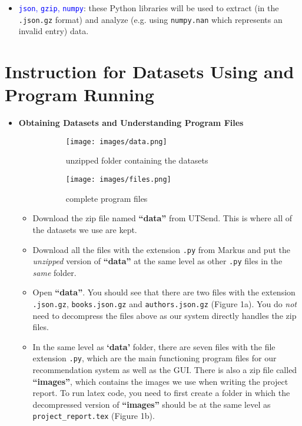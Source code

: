 \documentclass[fontsize=11pt]{article}
\begin{document}
\begin{itemize}
\begin{itemize}
    \item \textcolor{blue}{\texttt{json}, \texttt{gzip}, \texttt{numpy}}: these Python libraries will be used to extract (in the \texttt{.json.gz} format) and analyze (e.g. using \texttt{numpy.nan} which represents an invalid entry) data.
\end{itemize}
\end{itemize}

\section*{Instruction for Datasets Using and Program Running}
\begin{itemize}
    \item \textbf{Obtaining Datasets and Understanding Program Files}
    \begin{figure}[h!]
	\centering
        \begin{subfigure}[b]{0.3\textwidth}
    	\texttt{[image: images/data.png]}
            \caption{unzipped folder containing the datasets}
        \end{subfigure}
        \begin{subfigure}[b]{0.3\textwidth}
            \texttt{[image: images/files.png]}
            \caption{complete program files}
        \end{subfigure}
        \caption{}
        \label{fig:folder}
    \end{figure}
    \begin{itemize}
        \item Download the zip file named \textbf{``data''} from UTSend. This is where all of the datasets we use are kept.
        \item Download all the files with the extension \texttt{.py} from Markus and put the \textit{unzipped} version of \textbf{``data''} at the same level as other \texttt{.py} files in the \textit{same} folder.
        \item Open \textbf{``data''}. You should see that there are two files with the extension \texttt{.json.gz}, \texttt{books.json.gz} and \texttt{authors.json.gz} (Figure 1a). You do \textit{not} need to decompress the files above as our system directly handles the zip files.
        \item In the same level as \textbf{`data'} folder, there are seven files with the file extension \texttt{.py}, which are the main functioning program files for our recommendation system as well as the GUI. There is also a zip file called \textbf{``images''}, which contains the images we use when writing the project report. To run latex code, you need to first create a folder in which the decompressed version of \textbf{``images''} should be at the same level as \texttt{project\_report.tex} (Figure 1b).
    \end{itemize}


\end{itemize}
\end{document}

